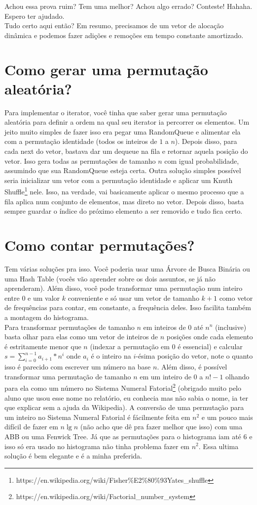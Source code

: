 \documentclass{article}
\begin{document}
Achou essa prova ruim? Tem uma melhor? Achou algo errado? Conteste! Hahaha. Espero ter ajudado. \\
Tudo certo aqui então? Em resumo, precisamos de um vetor de alocação dinâmica e podemos fazer adições e remoções em tempo constante amortizado.

\section{Como gerar uma permutação aleatória?}
Para implementar o iterator, você tinha que saber gerar uma permutação aleatória para definir a ordem na qual seu iterator ia percorrer os elementos. Um jeito muito simples de fazer isso era pegar uma RandomQueue e alimentar ela com a permutação identidade (todos os inteiros de $1$ a $n$). Depois disso, para cada next do vetor, bastava dar um dequeue na fila e retornar aquela posição do vetor. Isso gera todas as permutações de tamanho $n$ com igual probabilidade, assumindo que sua RandomQueue esteja certa. Outra solução simples possível seria inicializar um vetor com a permutação identidade e aplicar um Knuth Shuffle\footnote{https://en.wikipedia.org/wiki/Fisher\%E2\%80\%93Yates\_shuffle} nele. Isso, na verdade, vai basicamente aplicar o mesmo processo que a fila aplica num conjunto de elementos, mas direto no vetor. Depois disso, basta sempre guardar o índice do próximo elemento a ser removido e tudo fica certo.

\section{Como contar permutações?}
Tem várias soluções pra isso. Você poderia usar uma Árvore de Busca Binária ou uma Hash Table (vocês vão aprender sobre os dois assuntos, se já não aprenderam). Além disso, você pode transformar uma permutação num inteiro entre $0$ e um valor $k$ conveniente e só usar um vetor de tamanho $k+1$ como vetor de frequências para contar, em constante, a frequência deles. Isso facilita também a montagem do histograma. \\
Para transformar permutações de tamanho $n$ em inteiros de $0$ até $n^n$ (inclusive) basta olhar para elas como um vetor de inteiros de $n$ posições onde cada elemento é estritamente menor que $n$ (indexar a permutação em $0$ é essencial) e calcular $s = \sum_{i=0}^{n-1} a_{i+1}*n^i$ onde $a_i$ é o inteiro na $i$-ésima posição do vetor, note o quanto isso é parecido com escrever um número na base $n$. Além disso, é possível transformar uma permutação de tamanho $n$ em um inteiro de $0$ a $n!-1$ olhando para ela como um número no Sistema Numeral Fatorial\footnote{https://en.wikipedia.org/wiki/Factorial\_number\_system} (obrigado muito pelo aluno que usou esse nome no relatório, eu conhecia mas não sabia o nome, ia ter que explicar sem a ajuda da Wikipedia). A conversão de uma permutação para um inteiro no Sistema Numeral Fatorial é fácilmente feita em $n^2$ e um pouco mais difícil de fazer em $n \lg n$ (não acho que dê pra fazer melhor que isso) com uma ABB ou uma Fenwick Tree. Já que as permutações para o histograma iam até $6$ e isso só era usado no histograma não tinha problema fazer em $n^2$. Essa ultima solução é bem elegante e é a minha preferida. \\
\end{document}
